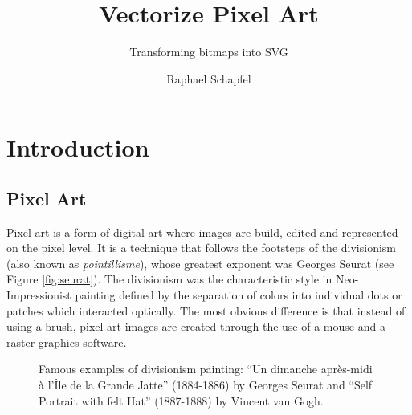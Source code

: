 \documentclass[]{usiinfbachelorproject}
\author{Raphael Schapfel}
\title{Vectorize Pixel Art}
\subtitle{Transforming bitmaps into SVG}
\begin{document}
\maketitle

\section{Introduction} \label{sec:intro} 

\subsection{Pixel Art}

Pixel art is a form of digital art where images are build, edited and represented on the pixel level. It is a technique that follows the footsteps of the divisionism (also known as {\it pointillisme}), whose greatest exponent was Georges Seurat (see Figure \ref{fig:seurat}). The divisionism was the characteristic style in Neo-Impressionist painting defined by the separation of colors into individual dots or patches which interacted optically. The most obvious difference is that instead of using a brush, pixel art images are created through the use of a mouse and a raster graphics software.

\begin{figure}[ht]
	\centering
	\caption{Famous examples of divisionism painting:  ``Un dimanche apr\`es-midi \`a l'\^Ile de la Grande Jatte'' (1884-1886) by Georges Seurat and  ``Self Portrait with felt Hat'' (1887-1888) by Vincent van Gogh.}
	\label{fig:divisionism}
\end{figure}
\end{document}
